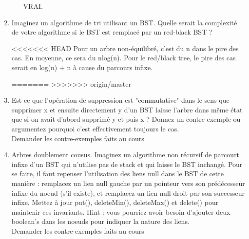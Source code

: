 \documentclass[11pt]{article}
\begin{document}
\begin{enumerate}
\begin{enumerate}
{\color{dkgreen}VRAI.}
\end{enumerate}
\item Imaginez un algorithme de tri utilisant un BST. Quelle serait la complexité de
votre algorithme si le BST est remplacé par un red-black BST ?


<<<<<<< HEAD
{\color{dkgreen}Pour un arbre non-équilibré, c'est du n dans le pire des cas. En moyenne, ce sera du nlog(n). Pour le red/black tree, le pire des cas serait en log(n) $+$ n à cause du parcours infixe.}

=======
>>>>>>> origin/master
\item Est-ce que l’opération de suppression est "commutative" dans le sens que supprimer
x et ensuite directement y d’un BST laisse l’arbre dans même état que si on
avait d’abord supprimé y et puis x ? Donnez un contre exemple ou argumentez
pourquoi c’est effectivement toujours le cas. \\

{\color{dkgreen}Demander les contre-exemples faits au cours}

\item Arbres doublement cousus. Imaginez un algorithme non récursif de parcourt infixe
d’un BST qui n’utilise pas de stack et qui laisse le BST inchangé. Pour se faire, il
faut repenser l’utilisation des liens null dans le BST de cette manière : remplacez
un lien null gauche par un pointeur vers son prédécesseur infixe du noeud
(s’il existe), et remplacez un lien null droit par son successeur infixe. Mettez
à jour put(), deleteMin(), deleteMax() et delete() pour maintenir
ces invariants. Hint : vous pourriez avoir besoin d’ajouter deux boolean’s dans
les noeuds pour indiquer la nature des liens.\\

{\color{dkgreen}Demander les contre-exemples faits au cours}

\end{enumerate}
\end{document}
